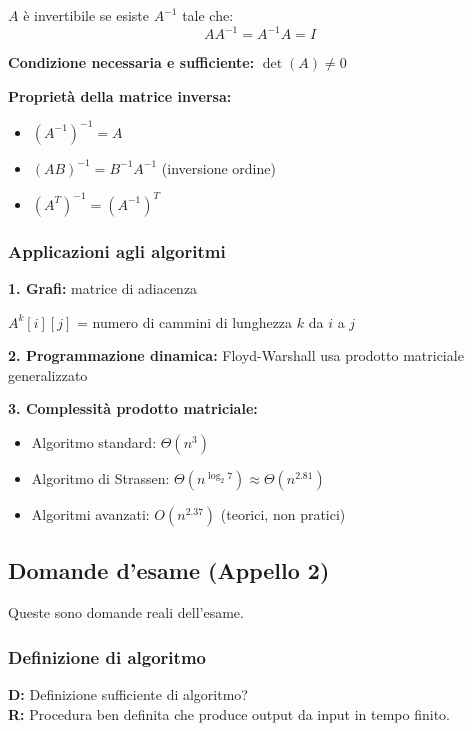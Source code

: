 \begin{definizione}
	$A$ è invertibile se esiste $A^{-1}$ tale che:
	\[
	AA^{-1} = A^{-1}A = I
	\]
	
	\textbf{Condizione necessaria e sufficiente:} $\det(A) \neq 0$
\end{definizione}

\textbf{Proprietà della matrice inversa:}
\begin{itemize}
	\item $(A^{-1})^{-1} = A$
	\item $(AB)^{-1} = B^{-1}A^{-1}$ (inversione ordine)
	\item $(A^T)^{-1} = (A^{-1})^T$
\end{itemize}

\subsubsection{Applicazioni agli algoritmi}

\textbf{1. Grafi:} matrice di adiacenza

$A^k[i][j]$ = numero di cammini di lunghezza $k$ da $i$ a $j$

\textbf{2. Programmazione dinamica:} Floyd-Warshall usa prodotto matriciale generalizzato

\textbf{3. Complessità prodotto matriciale:}
\begin{itemize}
	\item Algoritmo standard: $\Theta(n^3)$
	\item Algoritmo di Strassen: $\Theta(n^{\log_2 7}) \approx \Theta(n^{2.81})$
	\item Algoritmi avanzati: $O(n^{2.37})$ (teorici, non pratici)
\end{itemize}


\subsection{Domande d'esame (Appello 2)}

\begin{hardnote}
	Queste sono domande reali dell'esame.\footnotemark
\end{hardnote}


\subsubsection*{Definizione di algoritmo}
\textbf{D:} Definizione sufficiente di algoritmo?\\
\textbf{R:} Procedura ben definita che produce output da input in tempo finito.

